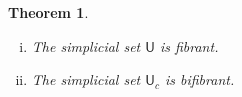 \documentclass[reqno,10pt,a4paper,oneside]{amsart}
\numberwithin{equation}{section}
\theoremstyle{mythm}
\newtheorem{theorem}{Theorem}[section]
\theoremstyle{mydef}
\theoremstyle{myrmk}
\newcommand{\co}{\colon}
\newcommand{\U}{\mathsf{U}}
\begin{document}


\begin{theorem} \label{thm:fibrancy-of-u-and-uc} \hfill 
\begin{enumerate}[(i)] 
\item The simplicial set $\U$ is fibrant. 
\item The simplicial set $\U_c$ is bifibrant. 
\end{enumerate}
\end{theorem}
\end{document}
